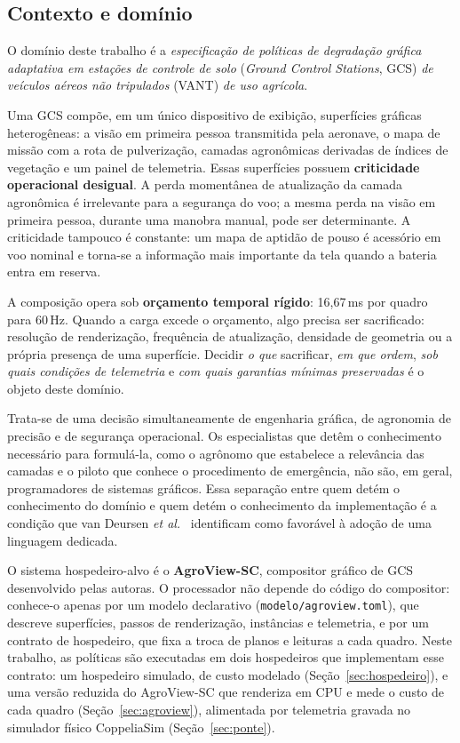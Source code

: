 \documentclass[conference]{IEEEtran}
\begin{document}
\subsection{Contexto e domínio}
\label{sec:dominio}

O domínio deste trabalho é a \textit{especificação de políticas de degradação
gráfica adaptativa em estações de controle de solo} (\textit{Ground Control
Stations}, GCS) \textit{de veículos aéreos não tripulados} (VANT)
\textit{de uso agrícola}.

Uma GCS compõe, em um único dispositivo de exibição, superfícies gráficas
heterogêneas: a visão em primeira pessoa transmitida pela aeronave, o mapa de
missão com a rota de pulverização, camadas agronômicas derivadas de índices de
vegetação e um painel de telemetria. Essas superfícies possuem
\textbf{criticidade operacional desigual}. A perda momentânea de atualização da
camada agronômica é irrelevante para a segurança do voo; a mesma perda na visão
em primeira pessoa, durante uma manobra manual, pode ser determinante. A
criticidade tampouco é constante: um mapa de aptidão de pouso é acessório em
voo nominal e torna-se a informação mais importante da tela quando a bateria
entra em reserva.

A composição opera sob \textbf{orçamento temporal rígido}: 16,67\,ms por quadro
para 60\,Hz. Quando a carga excede o orçamento, algo precisa ser sacrificado:
resolução de renderização, frequência de atualização, densidade de geometria ou
a própria presença de uma superfície. Decidir \textit{o que} sacrificar,
\textit{em que ordem}, \textit{sob quais condições de telemetria} e \textit{com
quais garantias mínimas preservadas} é o objeto deste domínio.

Trata-se de uma decisão simultaneamente de engenharia gráfica, de agronomia de
precisão e de segurança operacional. Os especialistas que detêm o conhecimento
necessário para formulá-la, como o agrônomo que estabelece a relevância das
camadas e o piloto que conhece o procedimento de emergência, não são, em geral,
programadores de sistemas gráficos. Essa separação entre quem detém o
conhecimento do domínio e quem detém o conhecimento da implementação é a
condição que van Deursen \textit{et al.}~\cite{vandeursen2000} identificam como
favorável à adoção de uma linguagem dedicada.

O sistema hospedeiro-alvo é o \textbf{AgroView-SC}, compositor gráfico de GCS
desenvolvido pelas autoras. O processador não depende do código do compositor:
conhece-o apenas por um modelo declarativo (\texttt{modelo/agroview.toml}), que
descreve superfícies, passos de renderização, instâncias e telemetria, e por
um contrato de hospedeiro, que fixa a troca de planos e leituras a cada quadro.
Neste trabalho, as políticas são executadas em dois hospedeiros que implementam
esse contrato: um hospedeiro simulado, de custo modelado
(Seção~\ref{sec:hospedeiro}), e uma versão reduzida do AgroView-SC que
renderiza em CPU e mede o custo de cada quadro (Seção~\ref{sec:agroview}),
alimentada por telemetria gravada no simulador físico CoppeliaSim
(Seção~\ref{sec:ponte}).
\end{document}
